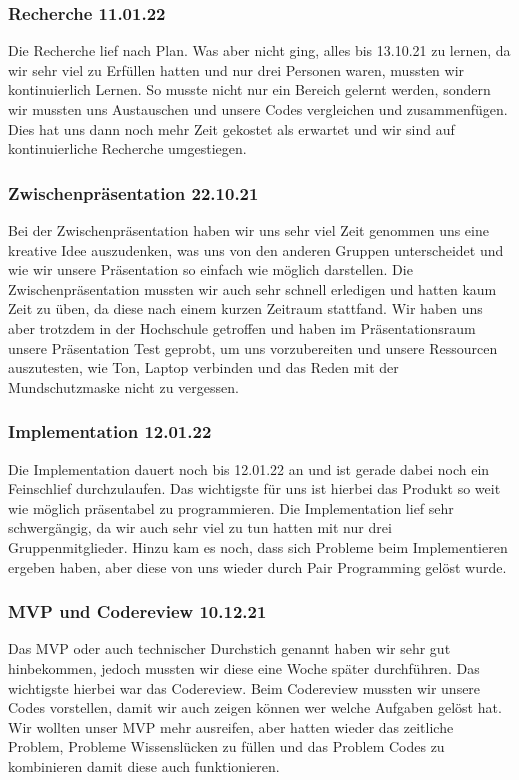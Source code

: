 \subsubsection{Recherche \color{red} 11.01.22}
Die Recherche lief nach Plan. Was aber nicht ging, alles bis 13.10.21 zu lernen, 
da wir sehr viel zu Erfüllen hatten und nur drei Personen waren, mussten wir kontinuierlich Lernen. 
So musste nicht nur ein Bereich gelernt werden, sondern wir mussten uns Austauschen und unsere Codes vergleichen und zusammenfügen. 
Dies hat uns dann noch mehr Zeit gekostet als erwartet und wir sind auf kontinuierliche Recherche umgestiegen.

\subsubsection{Zwischenpräsentation \color{green} 22.10.21}
Bei der Zwischenpräsentation haben wir uns sehr viel Zeit genommen uns eine kreative Idee auszudenken, 
was uns von den anderen Gruppen unterscheidet und wie wir unsere Präsentation so einfach wie möglich darstellen. 
Die Zwischenpräsentation mussten wir auch sehr schnell erledigen und hatten kaum Zeit zu üben, da diese nach einem kurzen Zeitraum stattfand. 
Wir haben uns aber trotzdem in der Hochschule getroffen und haben im Präsentationsraum unsere Präsentation Test geprobt, 
um uns vorzubereiten und unsere Ressourcen auszutesten, wie Ton, Laptop verbinden und das Reden mit der Mundschutzmaske nicht zu vergessen.

\subsubsection{Implementation \color{red} 12.01.22}
Die Implementation dauert noch bis 12.01.22 an und ist gerade dabei noch ein Feinschlief durchzulaufen. 
Das wichtigste für uns ist hierbei das Produkt so weit wie möglich präsentabel zu programmieren. 
Die Implementation lief sehr schwergängig, da wir auch sehr viel zu tun hatten mit nur drei Gruppenmitglieder. 
Hinzu kam es noch, dass sich Probleme beim Implementieren ergeben haben, aber diese von uns wieder durch Pair Programming gelöst wurde. 

\subsubsection{MVP und Codereview \color{red} 10.12.21}
Das MVP oder auch technischer Durchstich genannt haben wir sehr gut hinbekommen, jedoch mussten wir diese eine Woche später durchführen. 
Das wichtigste hierbei war das Codereview. Beim Codereview mussten wir unsere Codes vorstellen, damit wir auch zeigen können wer welche Aufgaben gelöst hat. 
Wir wollten unser MVP mehr ausreifen, aber hatten wieder das zeitliche Problem, Probleme Wissenslücken zu füllen und das Problem Codes zu kombinieren damit diese auch funktionieren. 

